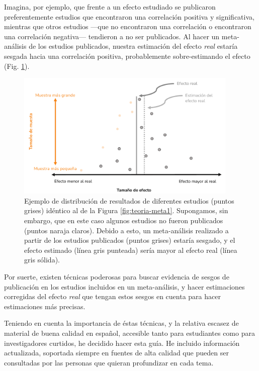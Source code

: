 \documentclass[
  bookmarksnumbered]{article}
\begin{document}
Imagina, por ejemplo, que frente a un efecto estudiado se publicaron preferentemente estudios que encontraron una correlación positiva y significativa, mientras que otros estudios ---que no encontraron una correlación o encontraron una correlación negativa--- tendieron a no ser publicados. Al hacer un meta-análisis de los estudios publicados, nuestra estimación del efecto \emph{real} estaría sesgada hacia una correlación positiva, probablemente sobre-estimando el efecto (Fig. \ref{fig:teoria-meta2}).

\begin{figure}

{\centering \includegraphics[width=400px]{images/Teoria-meta2} 

}

\caption{Ejemplo de distribución de resultados de diferentes estudios (puntos grises) idéntico al de la Figura \ref{fig:teoria-meta1}. Supongamos, sin embargo, que en este caso algunos estudios no fueron publicados (puntos naraja claros). Debido a esto, un meta-análisis realizado a partir de los estudios publicados (puntos grises) estaría sesgado, y el efecto estimado (línea gris punteada) sería mayor al efecto real (línea gris sólida).}\label{fig:teoria-meta2}
\end{figure}

Por suerte, existen técnicas poderosas para buscar evidencia de sesgos de publicación en los estudios incluidos en un meta-análisis, y hacer estimaciones corregidas del efecto \emph{real} que tengan estos sesgos en cuenta para hacer estimaciones más precisas.

Teniendo en cuenta la importancia de éstas técnicas, y la relativa escasez de material de buena calidad en español, accesible tanto para estudiantes como para investigadores curtidos, he decidido hacer esta guía. He incluido información actualizada, soportada siempre en fuentes de alta calidad que pueden ser consultadas por las personas que quieran profundizar en cada tema.
\end{document}
